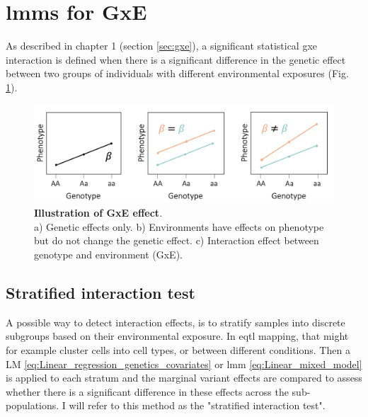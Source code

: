 

\newpage 


\section{\gls{lmm}s for GxE}

As described in chapter 1 (section \ref{sec:gxe}), a significant statistical \gls{gxe} interaction is defined when there is a significant difference in the genetic effect between two groups of individuals with different environmental exposures (Fig. \ref{fig:gxe}).

\begin{figure}[h]
\centering
\includegraphics[width=15cm]{Chapter1/Fig/GxE.png}
\caption[\textbf{Illustration of GxE}]{\textbf{Illustration of GxE effect}.\\
a) Genetic effects only. b) Environments have effects on phenotype but do not change the genetic effect. c) Interaction effect between genotype and environment (GxE).}
\label{fig:gxe}
\end{figure}

\subsection{Stratified interaction test}

A possible way to detect interaction effects, is to stratify samples into discrete subgroups based on their environmental exposure.
In e\gls{qtl} mapping, that might for example cluster cells into cell types, or between different conditions.
Then a LM \eqref{eq:Linear_regression_genetics_covariates} or \gls{lmm} \eqref{eq:Linear_mixed_model} is applied to each stratum and the marginal variant effects are compared to assess whether there is a significant difference in these effects across the sub-populations.
I will refer to this method as the "stratified interaction test".

